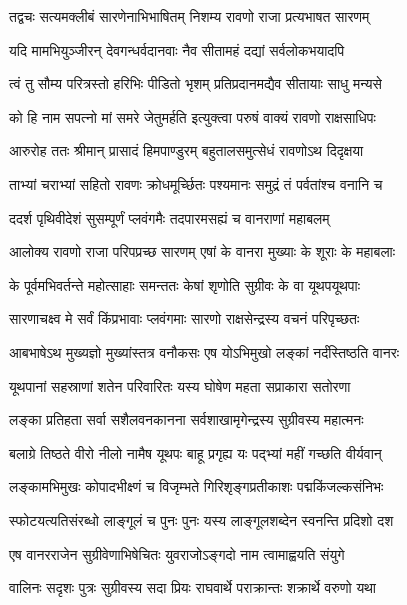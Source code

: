 
\twolineshloka
{तद्वचः सत्यमक्लीबं सारणेनाभिभाषितम्}
{निशम्य रावणो राजा प्रत्यभाषत सारणम्} %

\twolineshloka
{यदि मामभियुञ्जीरन् देवगन्धर्वदानवाः}
{नैव सीतामहं दद्यां सर्वलोकभयादपि} %

\twolineshloka
{त्वं तु सौम्य परित्रस्तो हरिभिः पीडितो भृशम्}
{प्रतिप्रदानमद्यैव सीतायाः साधु मन्यसे} %

\twolineshloka
{को हि नाम सपत्नो मां समरे जेतुमर्हति}
{इत्युक्त्वा परुषं वाक्यं रावणो राक्षसाधिपः} %

\twolineshloka
{आरुरोह ततः श्रीमान् प्रासादं हिमपाण्डुरम्}
{बहुतालसमुत्सेधं रावणोऽथ दिदृक्षया} %

\twolineshloka
{ताभ्यां चराभ्यां सहितो रावणः क्रोधमूर्च्छितः}
{पश्यमानः समुद्रं तं पर्वतांश्च वनानि च} %

\twolineshloka
{ददर्श पृथिवीदेशं सुसम्पूर्णं प्लवंगमैः}
{तदपारमसह्यं च वानराणां महाबलम्} %

\twolineshloka
{आलोक्य रावणो राजा परिपप्रच्छ सारणम्}
{एषां के वानरा मुख्याः के शूराः के महाबलाः} %

\twolineshloka
{के पूर्वमभिवर्तन्ते महोत्साहाः समन्ततः}
{केषां शृणोति सुग्रीवः के वा यूथपयूथपाः} %

\twolineshloka
{सारणाचक्ष्व मे सर्वं किंप्रभावाः प्लवंगमाः}
{सारणो राक्षसेन्द्रस्य वचनं परिपृच्छतः} %

\twolineshloka
{आबभाषेऽथ मुख्यज्ञो मुख्यांस्तत्र वनौकसः}
{एष योऽभिमुखो लङ्कां नर्दंस्तिष्ठति वानरः} %

\twolineshloka
{यूथपानां सहस्राणां शतेन परिवारितः}
{यस्य घोषेण महता सप्राकारा सतोरणा} %

\twolineshloka
{लङ्का प्रतिहता सर्वा सशैलवनकानना}
{सर्वशाखामृगेन्द्रस्य सुग्रीवस्य महात्मनः} %

\twolineshloka
{बलाग्रे तिष्ठते वीरो नीलो नामैष यूथपः}
{बाहू प्रगृह्य यः पद्भ्यां महीं गच्छति वीर्यवान्} %

\twolineshloka
{लङ्कामभिमुखः कोपादभीक्ष्णं च विजृम्भते}
{गिरिशृङ्गप्रतीकाशः पद्मकिंजल्कसंनिभः} %

\twolineshloka
{स्फोटयत्यतिसंरब्धो लाङ्गूलं च पुनः पुनः}
{यस्य लाङ्गूलशब्देन स्वनन्ति प्रदिशो दश} %

\twolineshloka
{एष वानरराजेन सुग्रीवेणाभिषेचितः}
{युवराजोऽङ्गदो नाम त्वामाह्वयति संयुगे} %

\twolineshloka
{वालिनः सदृशः पुत्रः सुग्रीवस्य सदा प्रियः}
{राघवार्थे पराक्रान्तः शक्रार्थे वरुणो यथा} %

